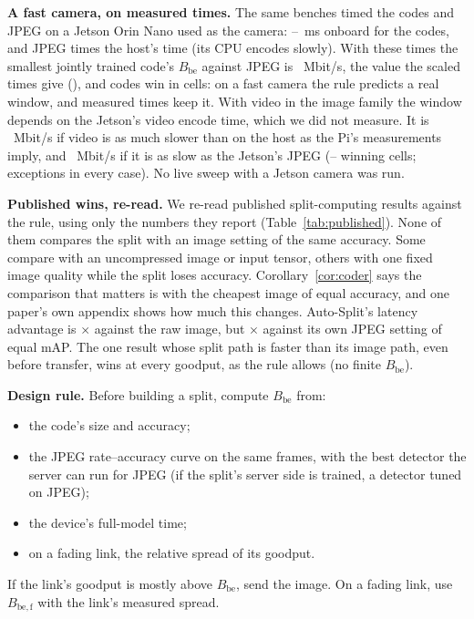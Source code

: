 \textbf{A fast camera, on measured times.} The same benches timed the codes and JPEG on a Jetson Orin Nano used as
the camera: \BpJetCodeMsMin--\BpJetCodeMsMax~ms onboard for the codes, and JPEG \BpJetJpegRatio{} times the host's
time (its CPU encodes slowly). With these times the smallest jointly trained code's $B_{\mathrm{be}}$ against JPEG
is \BpJetHeadJpeg~Mbit/s, the value the scaled times give (\BpJetHeadJpegRule), and codes win in \BpJetWinsJpeg{}
cells: on a fast camera the rule predicts a real window, and measured times keep it. With video in the image family the
window depends on the Jetson's video encode time, which we did not measure. It is \BpJetHeadVideoLo~Mbit/s if video
is as much slower than on the host as the Pi's measurements imply, and \BpJetHeadVideoHi~Mbit/s if it is as slow
as the Jetson's JPEG (\BpJetWinsVideoMin--\BpJetWinsVideoMax{} winning cells; \BpJetExc{} exceptions in every case).
No live sweep with a Jetson camera was run.

\textbf{Published wins, re-read.} We re-read \BpLitPapers{} published split-computing results against the rule, using
only the numbers they report (Table~\ref{tab:published}). None of them compares the split with an image setting of
the same accuracy. Some compare with an uncompressed image or input tensor, others with one fixed image quality while
the split loses accuracy. Corollary~\ref{cor:coder} says the comparison that matters is with the cheapest image of equal
accuracy, and one paper's own appendix shows how much this changes. Auto-Split's latency advantage is
\BpLitAutoRaw$\times$ against the raw image, but \BpLitAutoMatched$\times$ against its own JPEG setting of equal mAP.
The one result whose split path is faster than its image path, even before transfer, wins at every goodput, as the
rule allows (no finite $B_{\mathrm{be}}$).
\begin{table}[t]
\centering
\caption{Published split-computing results read against the break-even rule (numbers as reported by each paper; arXiv
versions read in November 2026).}
\label{tab:published}
\small

\end{table}

\textbf{Design rule.} Before building a split, compute $B_{\mathrm{be}}$ from:
\begin{itemize}
\item the code's size and accuracy;
\item the JPEG rate--accuracy curve on the same frames, with the best detector the server can run for JPEG (if the
split's server side is trained, a detector tuned on JPEG);
\item the device's full-model time;
\item on a fading link, the relative spread of its goodput.
\end{itemize}
If the link's goodput is mostly above $B_{\mathrm{be}}$, send the image. On a fading link, use $B_{\mathrm{be,f}}$
with the link's measured spread.
